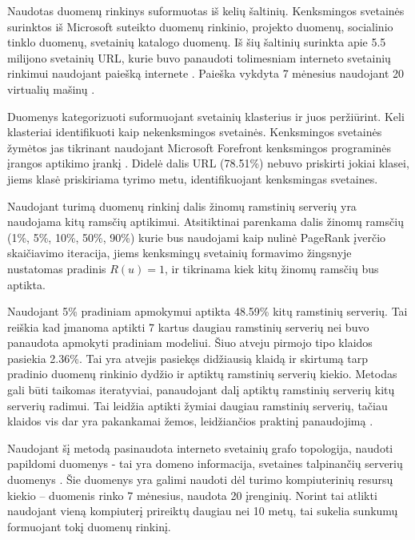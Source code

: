 Naudotas duomenų rinkinys suformuotas iš kelių šaltinių. Kenksmingos svetainės surinktos iš Microsoft suteikto duomenų rinkinio,  projekto duomenų,  socialinio tinklo duomenų,  svetainių katalogo duomenų. Iš šių šaltinių surinkta apie 5.5 milijono svetainių URL, kurie buvo panaudoti tolimesniam interneto svetainių  rinkimui naudojant paiešką internete \cite{linchpins}. Paieška vykdyta 7 mėnesius naudojant 20 virtualių mašinų \cite{linchpins}.

Duomenys kategorizuoti suformuojant svetainių klasterius ir juos peržiūrint. Keli klasteriai identifikuoti kaip nekenksmingos svetainės. Kenksmingos svetainės žymėtos jas tikrinant naudojant Microsoft Forefront kenksmingos programinės įrangos aptikimo įrankį \cite{linchpins}. Didelė dalis URL (78.51\%) nebuvo priskirti jokiai klasei, jiems klasė priskiriama tyrimo metu, identifikuojant kenksmingas svetaines.

Naudojant turimą duomenų rinkinį dalis žinomų ramstinių serverių yra naudojama kitų ramsčių aptikimui. Atsitiktinai parenkama dalis žinomų ramsčių (1\%, 5\%, 10\%, 50\%, 90\%) kurie bus naudojami kaip nulinė PageRank įverčio skaičiavimo iteracija, jiems kenksmingų svetainių formavimo žingsnyje nustatomas pradinis $R(u) = 1$, ir tikrinama kiek kitų žinomų ramsčių bus aptikta.

Naudojant 5\% pradiniam apmokymui aptikta 48.59\% kitų ramstinių serverių. Tai reiškia kad įmanoma aptikti 7 kartus daugiau ramstinių serverių nei buvo panaudota apmokyti pradiniam modeliui. Šiuo atveju pirmojo tipo klaidos pasiekia 2.36\%. Tai yra atvejis pasiekęs didžiausią klaidą ir skirtumą tarp pradinio duomenų rinkinio dydžio ir aptiktų ramstinių serverių kiekio. Metodas gali būti taikomas iteratyviai, panaudojant dalį aptiktų ramstinių serverių kitų serverių radimui. Tai leidžia aptikti žymiai daugiau ramstinių serverių, tačiau klaidos vis dar yra pakankamai žemos, leidžiančios praktinį panaudojimą \cite{linchpins}.

Naudojant šį metodą pasinaudota interneto svetainių grafo topologija, naudoti papildomi duomenys - tai yra domeno informacija, svetaines talpinančių serverių duomenys \cite{linchpins}. Šie duomenys yra galimi naudoti dėl turimo kompiuterinių resursų kiekio -- duomenis rinko 7 mėnesius, naudota 20 įrenginių. Norint tai atlikti naudojant vieną kompiuterį prireiktų daugiau nei 10 metų, tai sukelia sunkumų formuojant tokį duomenų rinkinį.